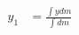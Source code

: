 \documentclass[12pt]{article}
\begin{document}
\begin{align*}
y_1 &= \frac{\int y dm}{\int dm}
\end{align*}
\end{document}
